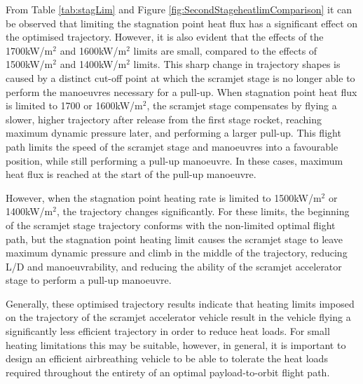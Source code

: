 From Table \ref{tab:stagLim} and Figure \ref{fig:SecondStageheatlimComparison} it can be observed that limiting the stagnation point heat flux has a significant effect on the optimised trajectory. However, it is also evident that the effects of the 1700kW/m$^2$ and 1600kW/m$^2$ limits are small, compared to the effects of 1500kW/m$^2$ and 1400kW/m$^2$ limits. 
This sharp change in trajectory shapes is caused by a distinct cut-off point at which the scramjet stage is no longer able to perform the manoeuvres necessary for a pull-up. When stagnation point heat flux is limited to 1700 or 1600kW/m$^2$, the scramjet stage compensates by flying a slower, higher trajectory after release from the first stage rocket, reaching maximum dynamic pressure later, and performing a larger pull-up. This flight path limits the speed of the scramjet stage and manoeuvres into a favourable position, while still performing a pull-up manoeuvre. In these cases, maximum heat flux is reached at the start of the pull-up manoeuvre. 

However, when the stagnation point heating rate is limited to 1500kW/m$^2$ or 1400kW/m$^2$, the trajectory changes significantly. For these limits, the beginning of the scramjet stage trajectory conforms with the non-limited optimal flight path, but the stagnation point heating limit causes the scramjet stage to leave maximum dynamic pressure and climb in the middle of the trajectory, reducing L/D and manoeuvrability, and reducing the ability of the scramjet accelerator stage to perform a pull-up manoeuvre. 

Generally, these optimised trajectory results indicate that heating limits imposed on the trajectory of the scramjet accelerator vehicle result in the vehicle flying a significantly less efficient trajectory in order to reduce heat loads.
For small heating limitations this may be suitable, however, in general, it is important to design an efficient airbreathing vehicle to be able to tolerate the heat loads required throughout the entirety of an optimal payload-to-orbit flight path. 



